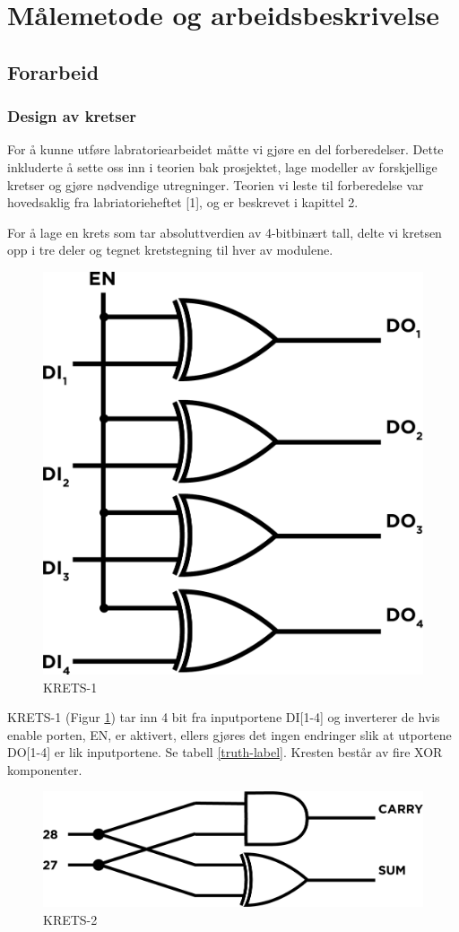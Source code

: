 \documentclass{article}
\begin{document}

\section{Målemetode og arbeidsbeskrivelse}

\subsection{Forarbeid}
\subsubsection{Design av kretser}
For å kunne utføre labratoriearbeidet måtte vi gjøre en del forberedelser. Dette inkluderte å sette oss inn i teorien bak prosjektet, lage modeller av forskjellige kretser og gjøre nødvendige utregninger. Teorien vi leste til forberedelse var hovedsaklig fra labriatorieheftet [1], og er beskrevet i kapittel 2.

For å lage en krets som tar absoluttverdien av 4-bitbinært tall, delte vi kretsen opp i tre deler og tegnet kretstegning til hver av modulene.

\begin{figure}[H]
	\centering
	\includegraphics[width=0.2\linewidth]{krets1}
	\caption{KRETS-1}
	\label{fig:KRETS-1}
\end{figure}

KRETS-1 (Figur \ref{fig:KRETS-1}) tar inn 4 bit fra inputportene DI[1-4] og inverterer de hvis enable porten, EN, er aktivert, ellers gjøres det ingen endringer slik at utportene DO[1-4] er lik inputportene. Se tabell \ref{truth-label}. Kresten består av fire XOR komponenter.

\begin{figure}[H]
	\centering
	\includegraphics[width=0.4\linewidth]{krets2}
	\caption{KRETS-2}
	\label{fig:KRETS-2}
\end{figure}
\end{document}
